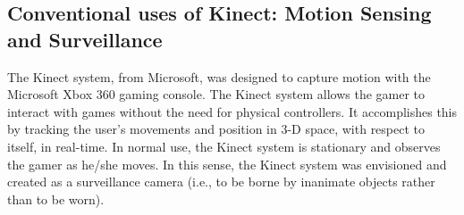 
\subsection{Conventional uses of Kinect: Motion Sensing and Surveillance}
The Kinect system, from Microsoft, was designed to capture motion with the Microsoft Xbox 360 gaming console.  The Kinect system allows the gamer to interact with games without the need for physical controllers. It accomplishes this by tracking the user's movements and position in 3-D space, with respect to itself, in real-time. In normal use, the Kinect system is stationary and observes the gamer as he/she moves.  In this sense, the Kinect system was envisioned and created as a surveillance camera (i.e., to be borne by inanimate objects rather than to be worn). 


